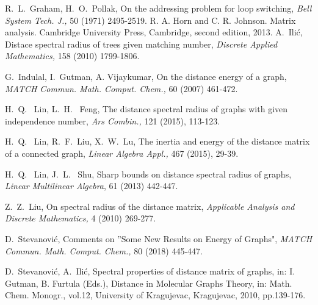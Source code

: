 \documentclass[10pt]{article}
\begin{document}
\begin{thebibliography}{}
R.~L.~Graham, H.~O.~Pollak, On the addressing problem for loop switching, {\it Bell System Tech. J.,}  50 (1971) 2495-2519.
R. A. Horn and C. R. Johnson. Matrix analysis. Cambridge University Press, Cambridge,
second edition, 2013.
A.~Ili\'{c}, Distace spectral radius of trees given matching number,
{\it Discrete Applied Mathematics,}  158 (2010) 1799-1806.

G.~Indulal, I.~Gutman, A. Vijaykumar, On the distance energy of a graph, {\it MATCH Commun. Math.
Comput. Chem.,} 60 (2007) 461-472.


H.~Q.~ Lin, L.~H.~ Feng, The distance spectral radius of graphs with given independence number, {\it Ars Combin.,} 121 (2015), 113-123.

H.~Q.~ Lin, R.~F.~Liu, X.~W.~Lu, The inertia and energy of the distance matrix of a connected graph, {\it Linear Algebra Appl.,} 467 (2015), 29-39.

H.~Q.~ Lin, J.~L.~ Shu, Sharp bounds on distance spectral radius of graphs, {\it Linear Multilinear Algebra}, 61 (2013) 442-447.

Z.~Z.~Liu, On spectral radius of the distance matrix, {\it Applicable Analysis and Discrete Mathematics,} 4 (2010) 269-277.




D.~Stevanovi\'{c}, Comments on ''Some New Results on Energy of Graphs",   {\it MATCH Commun. Math. Comput. Chem.,}  80 (2018) 445-447.

D.~Stevanovi\'{c}, A.~Ili\'{c}, Spectral properties of distance matrix of graphs, in: I. Gutman, B. Furtula (Eds.), Distance in Molecular Graphs Theory, in: Math. Chem. Monogr., vol.12, University of Kragujevac, Kragujevac, 2010, pp.139-176.


\end{thebibliography}
\end{document}
